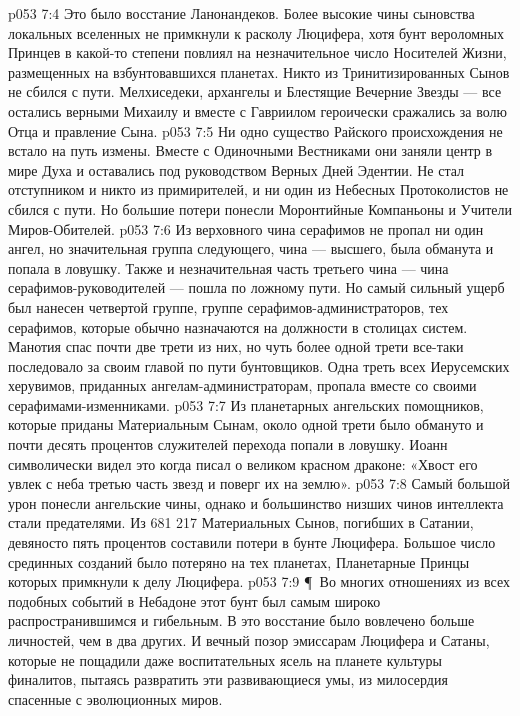 \vs p053 7:4 Это было восстание Ланонандеков. Более высокие чины сыновства локальных вселенных не примкнули к расколу Люцифера, хотя бунт вероломных Принцев в какой\hyp{}то степени повлиял на незначительное число Носителей Жизни, размещенных на взбунтовавшихся планетах. Никто из Тринитизированных Сынов не сбился с пути. Мелхиседеки, архангелы и Блестящие Вечерние Звезды --- все остались верными Михаилу и вместе с Гавриилом героически сражались за волю Отца и правление Сына.
\vs p053 7:5 Ни одно существо Райского происхождения не встало на путь измены. Вместе с Одиночными Вестниками они заняли центр в мире Духа и оставались под руководством Верных Дней Эдентии. Не стал отступником и никто из примирителей, и ни один из Небесных Протоколистов не сбился с пути. Но большие потери понесли Моронтийные Компаньоны и Учители Миров\hyp{}Обителей.
\vs p053 7:6 Из верховного чина серафимов не пропал ни один ангел, но значительная группа следующего, чина --- высшего, была обманута и попала в ловушку. Также и незначительная часть третьего чина --- чина серафимов\hyp{}руководителей --- пошла по ложному пути. Но самый сильный ущерб был нанесен четвертой группе, группе серафимов\hyp{}администраторов, тех серафимов, которые обычно назначаются на должности в столицах систем. Манотия спас почти две трети из них, но чуть более одной трети все\hyp{}таки последовало за своим главой по пути бунтовщиков. Одна треть всех Иерусемских херувимов, приданных ангелам\hyp{}администраторам, пропала вместе со своими серафимами\hyp{}изменниками.
\vs p053 7:7 Из планетарных ангельских помощников, которые приданы Материальным Сынам, около одной трети было обмануто и почти десять процентов служителей перехода попали в ловушку. Иоанн символически видел это когда писал о великом красном драконе: «Хвост его увлек с неба третью часть звезд и поверг их на землю».
\vs p053 7:8 Самый большой урон понесли ангельские чины, однако и большинство низших чинов интеллекта стали предателями. Из 681 217 Материальных Сынов, погибших в Сатании, девяносто пять процентов составили потери в бунте Люцифера. Большое число срединных созданий было потеряно на тех планетах, Планетарные Принцы которых примкнули к делу Люцифера.
\vs p053 7:9 \P\ Во многих отношениях из всех подобных событий в Небадоне этот бунт был самым широко распространившимся и гибельным. В это восстание было вовлечено больше личностей, чем в два других. И вечный позор эмиссарам Люцифера и Сатаны, которые не пощадили даже воспитательных ясель на планете культуры финалитов, пытаясь развратить эти развивающиеся умы, из милосердия спасенные с эволюционных миров.
